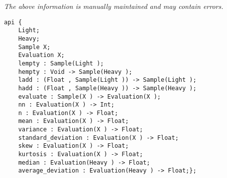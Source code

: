\label{pkg:univariate\_sample}

{\tiny \it The above information is manually maintained and may contain errors.}
\begin{verbatim}
api {
    Light;
    Heavy;
    Sample X;
    Evaluation X;
    lempty : Sample(Light );
    hempty : Void -> Sample(Heavy );
    ladd : (Float , Sample(Light )) -> Sample(Light );
    hadd : (Float , Sample(Heavy )) -> Sample(Heavy );
    evaluate : Sample(X ) -> Evaluation(X );
    nn : Evaluation(X ) -> Int;
    n : Evaluation(X ) -> Float;
    mean : Evaluation(X ) -> Float;
    variance : Evaluation(X ) -> Float;
    standard_deviation : Evaluation(X ) -> Float;
    skew : Evaluation(X ) -> Float;
    kurtosis : Evaluation(X ) -> Float;
    median : Evaluation(Heavy ) -> Float;
    average_deviation : Evaluation(Heavy ) -> Float;};
\end{verbatim}

